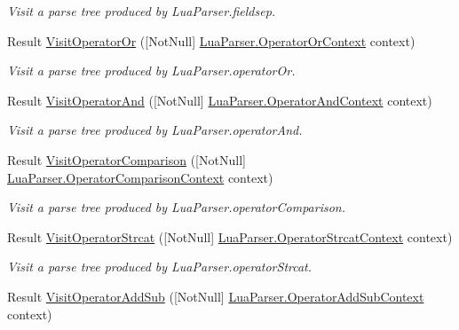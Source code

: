 \begin{DoxyCompactItemize}
\begin{DoxyCompactList}\small\item\em Visit a parse tree produced by Lua\+Parser.\+fieldsep. \end{DoxyCompactList}\item 
Result \mbox{\hyperlink{interfacezlua_1_1_i_lua_visitor_a35b6ad774142fb2dca6616d513025703}{Visit\+Operator\+Or}} (\mbox{[}Not\+Null\mbox{]} \mbox{\hyperlink{classzlua_1_1_lua_parser_1_1_operator_or_context}{Lua\+Parser.\+Operator\+Or\+Context}} context)
\begin{DoxyCompactList}\small\item\em Visit a parse tree produced by Lua\+Parser.\+operator\+Or. \end{DoxyCompactList}\item 
Result \mbox{\hyperlink{interfacezlua_1_1_i_lua_visitor_a62f776e1b24d6689591045ba24af62a0}{Visit\+Operator\+And}} (\mbox{[}Not\+Null\mbox{]} \mbox{\hyperlink{classzlua_1_1_lua_parser_1_1_operator_and_context}{Lua\+Parser.\+Operator\+And\+Context}} context)
\begin{DoxyCompactList}\small\item\em Visit a parse tree produced by Lua\+Parser.\+operator\+And. \end{DoxyCompactList}\item 
Result \mbox{\hyperlink{interfacezlua_1_1_i_lua_visitor_a981c3d7ed14831cde6805ea77ff4edeb}{Visit\+Operator\+Comparison}} (\mbox{[}Not\+Null\mbox{]} \mbox{\hyperlink{classzlua_1_1_lua_parser_1_1_operator_comparison_context}{Lua\+Parser.\+Operator\+Comparison\+Context}} context)
\begin{DoxyCompactList}\small\item\em Visit a parse tree produced by Lua\+Parser.\+operator\+Comparison. \end{DoxyCompactList}\item 
Result \mbox{\hyperlink{interfacezlua_1_1_i_lua_visitor_a1020362b6ec3e02795836cd5cd07cfe4}{Visit\+Operator\+Strcat}} (\mbox{[}Not\+Null\mbox{]} \mbox{\hyperlink{classzlua_1_1_lua_parser_1_1_operator_strcat_context}{Lua\+Parser.\+Operator\+Strcat\+Context}} context)
\begin{DoxyCompactList}\small\item\em Visit a parse tree produced by Lua\+Parser.\+operator\+Strcat. \end{DoxyCompactList}\item 
Result \mbox{\hyperlink{interfacezlua_1_1_i_lua_visitor_a530f85828f02eb15078b452db78726a0}{Visit\+Operator\+Add\+Sub}} (\mbox{[}Not\+Null\mbox{]} \mbox{\hyperlink{classzlua_1_1_lua_parser_1_1_operator_add_sub_context}{Lua\+Parser.\+Operator\+Add\+Sub\+Context}} context)

\end{DoxyCompactItemize}

